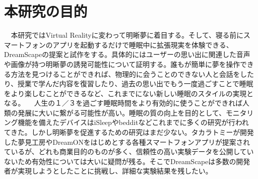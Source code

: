 \section{本研究の目的}
　本研究ではVirtual Realityに変わって明晰夢に着目する。そして、寝る前にスマートフォンのアプリを起動するだけで睡眠中に拡張現実を体験できる、DreamScapeの提案と試作をする。具体的にはユーザーの思い出に関連した音声や画像が持つ明晰夢の誘発可能性について証明する。誰もが簡単に夢を操作できる方法を見つけることができれば、物理的に会うことのできない人と会話をしたり、授業で学んだ内容を復習したり、過去の思い出でもう一度過ごすことで睡眠をより楽しむことができるなど、これまでにない新しい睡眠のスタイルの実現となる。
　人生の１／３を過ごす睡眠時間をより有効的に使うことができれば人類の発展に大いに繋がる可能性が高い。睡眠の質の向上を目的として、モニタリング機能を備えたデバイスはiSleep\cite{iSleep}やbeddit\cite{beddit}などこれまでに多くの研究が行われてきた。しかし明晰夢を促進するための研究はまだ少ない。タカラトミーが開発した夢見工房\cite{takaratomi}やDreamON\cite{dreamOn}をはじめとする各種スマートフォンアプリが提案されているが、どれも商業目的のものが多く、信頼性の高い実験データを公開していないため有効性については大いに疑問が残る。そこでDreamScapeは多数の開発者が実現しようとしたことに挑戦し、詳細な実験結果を残したい。


